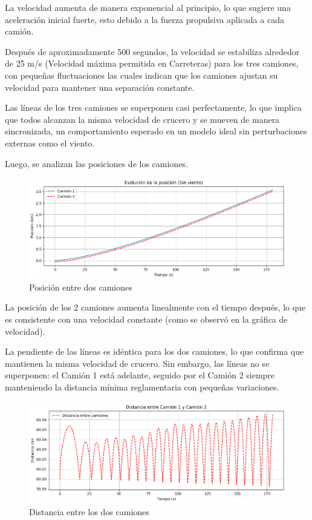 \documentclass[11pt,stdletter,orderfromtodate,sigleft,twoside]{report}
\begin{document}
La velocidad aumenta de manera exponencial al principio, lo que sugiere una aceleración inicial fuerte, esto debido a la fuerza propulsiva aplicada a cada camión. 

Después de aproximadamente 500 segundos, la velocidad se estabiliza alrededor de 25 m/s (Velocidad máxima permitida en Carreteras) para los tres camiones, con pequeñas fluctuaciones las cuales indican que los camiones ajustan su velocidad para mantener una separación constante.

Las líneas de los tres camiones se superponen casi perfectamente, lo que implica que todos alcanzan la misma velocidad de crucero y se mueven de manera sincronizada, un comportamiento esperado en un modelo ideal sin perturbaciones externas como el viento.

Luego, se analizan las posiciones de los camiones.

\begin{figure}[H]
    \centering
    \includegraphics[width=0.75\linewidth]{figures//Cars/evo posi 2 truck.png}
    \caption{Posición entre dos camiones}
    \label{fig:enter-label}
\end{figure}

La posición de los 2 camiones aumenta linealmente con el tiempo después, lo que es consistente con una velocidad constante (como se observó en la gráfica de velocidad).

La pendiente de las líneas es idéntica para los dos camiones, lo que confirma que mantienen la misma velocidad de crucero. Sin embargo, las líneas no se superponen: el Camión 1 está adelante, seguido por el Camión 2 siempre manteniendo la distancia mínima reglamentaria con pequeñas variaciones.

\begin{figure}[H]
    \centering
    \includegraphics[width=0.75\linewidth]{head way 2 trucks.png}
    \caption{Distancia entre los dos camiones}
    \label{fig:enter-label}
\end{figure}
\end{document}
